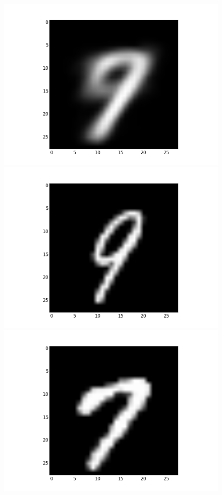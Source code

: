 \documentclass[submit]{harvardml}
\begin{document}
\begin{figure}[ht]
    \centering
    \includegraphics[scale=0.20]{K10-mean-2}
    \includegraphics[scale=0.20]{K10-representative-2-0}
    \includegraphics[scale=0.20]{K10-representative-2-1}

\end{figure}
\end{document}
